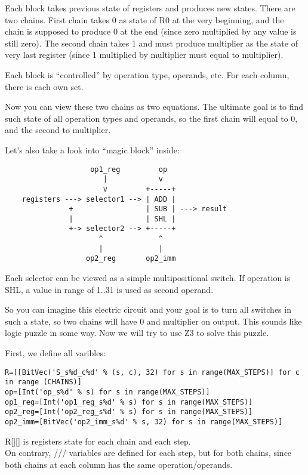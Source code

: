 Each block takes previous state of registers and produces new states.
There are two chains.
First chain takes 0 as state of R0 at the very beginning, and the chain is supposed to produce 0 at the end
(since zero multiplied by any value is still zero).
The second chain takes 1 and must produce multiplier as the state of very last register
(since 1 multiplied by multiplier must equal to multiplier).

Each block is ``controlled'' by operation type, operands, etc.
For each column, there is each own set.

Now you can view these two chains as two equations.
The ultimate goal is to find such state of all operation types and operands, so the first chain will equal to 0,
and the second to multiplier.

Let's also take a look into ``magic block'' inside:

\begin{lstlisting}
	                op1_reg         op
	                   |            v
	                   v         +-----+
	registers ---> selector1 --> | ADD |
	           +                 | SUB | ---> result
	           |                 | SHL |
	           +-> selector2 --> +-----+
	                  ^             ^
	                  |             |
	               op2_reg       op2_imm
\end{lstlisting}

Each selector can be viewed as a simple multipositional switch.
If operation is SHL, a value in range of 1..31 is used as second operand.

So you can imagine this electric circuit and your goal is to turn all switches in such a state, so two chains
will have 0 and multiplier on output.
This sounds like logic puzzle in some way.
Now we will try to use Z3 to solve this puzzle.

First, we define all varibles:

\begin{lstlisting}
R=[[BitVec('S_s%d_c%d' % (s, c), 32) for s in range(MAX_STEPS)] for c in range (CHAINS)]
op=[Int('op_s%d' % s) for s in range(MAX_STEPS)]
op1_reg=[Int('op1_reg_s%d' % s) for s in range(MAX_STEPS)]
op2_reg=[Int('op2_reg_s%d' % s) for s in range(MAX_STEPS)]
op2_imm=[BitVec('op2_imm_s%d' % s, 32) for s in range(MAX_STEPS)]
\end{lstlisting}

R[][] is registers state for each chain and each step.\\
On contrary, /// variables are defined for each step, but for both chains,
since both chains at each column has the same operation/operands.

